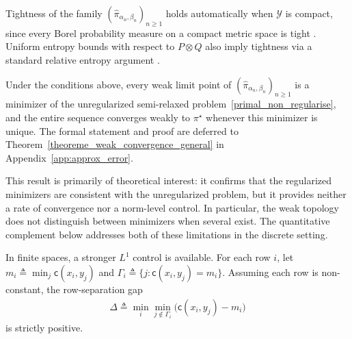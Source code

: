 \documentclass{article}
\begin{document}
Tightness of the family $(\hat\pi_{\alpha_n,\beta_n})_{n\geq 1}$ holds automatically
when $\mathcal{Y}$ is compact, since every Borel probability measure on a compact metric
space is tight \cite[Theorem~5.1]{billingsley1999convergence}. Uniform entropy bounds
with respect to $P\otimes Q$ also imply tightness via a standard relative entropy argument
\cite{billingsley1999convergence, budhiraja2019relative}.

Under the conditions above, every weak limit point of $(\hat\pi_{\alpha_n,\beta_n})_{n\geq 1}$ is a minimizer of the unregularized semi-relaxed problem~\eqref{primal_non_regularise}, and the entire sequence converges weakly to $\pi^\star$ whenever this minimizer is unique. The formal statement and proof are deferred to Theorem~\ref{theoreme_weak_convergence_general} in Appendix~\ref{app:approx_error}.

This result is primarily of theoretical interest: it confirms that the regularized
minimizers are consistent with the unregularized problem, but it provides neither a rate
of convergence nor a norm-level control. In particular, the weak topology does not
distinguish between minimizers when several exist. The quantitative complement below
addresses both of these limitations in the discrete setting.

In finite spaces, a stronger $L^1$ control is available. For each row $i$, let $m_i \triangleq \min_j \mathsf{c}(x_i,y_j)$ and $\Gamma_i \triangleq \{j : \mathsf{c}(x_i,y_j) = m_i\}$. Assuming each row is non-constant, the row-separation gap
\begin{align}
  \label{definition_delta}
  \Delta \triangleq \min_i \min_{j \notin \Gamma_i} \bigl(\mathsf{c}(x_i,y_j) - m_i\bigr)
\end{align}
is strictly positive.
\end{document}
